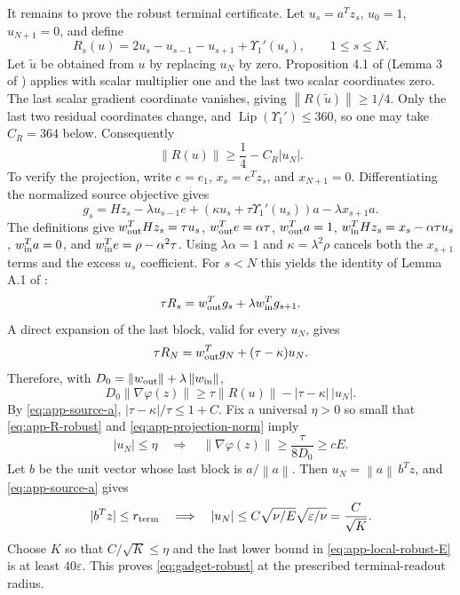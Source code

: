 \documentclass[11pt]{article}
\theoremstyle{remark}
\theoremstyle{remark}
\newcommand{\eps}{\varepsilon}
\newcommand{\norm}[1]{\left\lVert#1\right\rVert}
\newcommand{\Lip}{\operatorname{Lip}}
\begin{document}
It remains to prove the robust terminal certificate.  Let
$u_s=a^Tz_s$, $u_0=1$, $u_{N+1}=0$, and define
\[
 R_s(u)=2u_s-u_{s-1}-u_{s+1}+\Upsilon_1'(u_s),
 \qquad 1\le s\le N.
\]
Let $\widetilde u$ be obtained from $u$ by replacing $u_N$ by zero.
Proposition 4.1 of \cite{zhou} (Lemma 3 of \cite{carmon2}) applies
with scalar multiplier one and the last two scalar coordinates zero.
The last scalar gradient coordinate vanishes, giving
$\norm{R(\widetilde u)}\ge1/4$. Only the last two residual coordinates
change, and $\Lip(\Upsilon_1')\le360$, so one may take $C_R=364$ below.
Consequently
\begin{equation}
 \norm{R(u)}\ge \frac14-C_R|u_N|.                              \label{eq:app-R-robust}
\end{equation}
To verify the projection, write $e=e_1$, $x_s=e^Tz_s$, and
$x_{N+1}=0$. Differentiating the normalized source objective gives
\[
 g_s=Hz_s-\lambda u_{s-1}e
       +(\kappa u_s+\tau\Upsilon_1'(u_s))a-\lambda x_{s+1}a.
\]
The definitions give
$w_{\rm out}^THz_s=\tau u_s$,
$w_{\rm out}^Te=\alpha\tau$,
$w_{\rm out}^Ta=1$,
$w_{\rm in}^THz_s=x_s-\alpha\tau u_s$,
$w_{\rm in}^Ta=0$, and
$w_{\rm in}^Te=\rho-\alpha^2\tau$.
Using $\lambda\alpha=1$ and $\kappa=\lambda^2\rho$
cancels both the $x_{s+1}$ terms and the excess $u_s$ coefficient.
For $s<N$ this yields the identity of Lemma A.1 of \cite{zhou}:
\[
 \tau R_s=w_{\rm out}^Tg_s+\lambda w_{\rm in}^Tg_{s+1}.
\]
A direct expansion of the last block, valid for every $u_N$, gives
\begin{equation}
 \tau R_N=w_{\rm out}^Tg_N+(\tau-\kappa)u_N.                    \label{eq:app-last-projection}
\end{equation}
Therefore, with
$D_0=\norm{w_{\rm out}}+\lambda\norm{w_{\rm in}}$,
\begin{equation}
 D_0\norm{\nabla\varphi(z)}
 \ge\tau\norm{R(u)}-|\tau-\kappa|\,|u_N|.                      \label{eq:app-projection-norm}
\end{equation}
By \eqref{eq:app-source-a},
$|\tau-\kappa|/\tau\le1+C$.  Fix a universal $\eta>0$ so small that
\eqref{eq:app-R-robust} and \eqref{eq:app-projection-norm} imply
\begin{equation}
 |u_N|\le\eta
 \quad\Longrightarrow\quad
 \norm{\nabla\varphi(z)}\ge \frac{\tau}{8D_0}\ge cE.            \label{eq:app-local-robust-E}
\end{equation}
Let $b$ be the unit vector whose last block is $a/\norm a$.  Then
$u_N=\norm a\,b^Tz$, and \eqref{eq:app-source-a} gives
\[
 |b^Tz|\le r_{\rm term}
 \quad\Longrightarrow\quad
 |u_N|\le C\sqrt{\nu/E}\sqrt{\eps/\nu}
 =\frac{C}{\sqrt K}.
\]
Choose $K$ so that $C/\sqrt K\le\eta$ and the last lower bound in
\eqref{eq:app-local-robust-E} is at least $40\eps$.  This proves
\eqref{eq:gadget-robust} at the prescribed terminal-readout radius.
\end{document}
